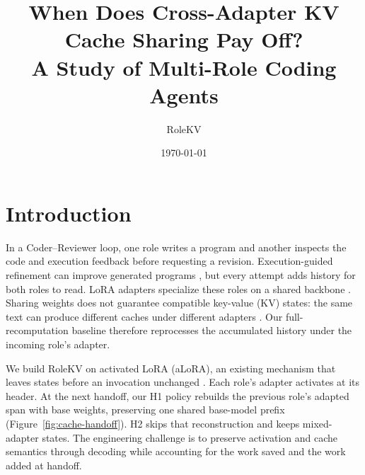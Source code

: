 \documentclass[10pt,twocolumn,letterpaper]{article}
\title{When Does Cross-Adapter KV Cache Sharing Pay Off?\\
  \large A Study of Multi-Role Coding Agents}
\author{RoleKV}
\date{\today}
\begin{document}

\section{Introduction}
In a Coder--Reviewer loop, one role writes a program and another inspects
the code and execution feedback before requesting a revision.
Execution-guided refinement can improve generated programs
\cite{chen2023selfdebug}, but every attempt adds history for both roles to
read. LoRA adapters specialize these roles on a shared backbone
\cite{hu2022lora}. Sharing weights does not guarantee compatible key-value
(KV) states: the same text can produce different caches under different
adapters \cite{greenewald2025alora}. Our full-recomputation baseline therefore
reprocesses the accumulated history under the incoming role's adapter.

We build RoleKV on activated LoRA (aLoRA), an existing mechanism that leaves
states before an invocation unchanged \cite{greenewald2025alora}. Each
role's adapter activates at its header. At the next handoff, our H1 policy
rebuilds the previous role's adapted span with base weights, preserving one
shared base-model prefix (Figure~\ref{fig:cache-handoff}). H2 skips that
reconstruction and keeps mixed-adapter states. The engineering challenge
is to preserve activation and cache semantics through decoding while
accounting for the work saved and the work added at handoff.
\end{document}
